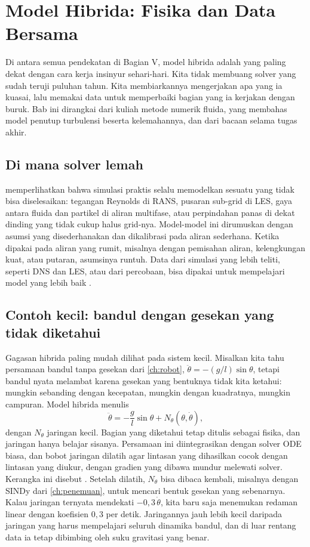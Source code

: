\chapter{Model Hibrida: Fisika dan Data Bersama}
\label{ch:hibrida}

Di antara semua pendekatan di Bagian V, model hibrida adalah yang paling dekat dengan cara kerja
insinyur sehari-hari. Kita tidak membuang solver yang sudah teruji puluhan tahun. Kita membiarkannya
mengerjakan apa yang ia kuasai, lalu memakai data untuk memperbaiki bagian yang ia kerjakan dengan
buruk. Bab ini dirangkai dari kuliah metode numerik fluida, yang membahas model penutup turbulensi
beserta kelemahannya, dan dari bacaan selama tugas akhir.

\section{Di mana solver lemah}

 memperlihatkan bahwa simulasi praktis selalu memodelkan sesuatu yang tidak bisa
diselesaikan: tegangan Reynolds di RANS, pusaran sub-grid di LES, gaya antara fluida dan partikel di
aliran multifase, atau perpindahan panas di dekat dinding yang tidak cukup halus grid-nya. Model-model ini
dirumuskan dengan asumsi yang disederhanakan dan dikalibrasi pada aliran sederhana. Ketika dipakai pada
aliran yang rumit, misalnya dengan pemisahan aliran, kelengkungan kuat, atau putaran, asumsinya runtuh.
Data dari simulasi yang lebih teliti, seperti DNS dan LES, atau dari percobaan, bisa dipakai untuk
mempelajari model yang lebih baik \citep{duraisamy2019}.

\section{Contoh kecil: bandul dengan gesekan yang tidak diketahui}

Gagasan hibrida paling mudah dilihat pada sistem kecil. Misalkan kita tahu persamaan bandul tanpa gesekan dari
\cref{ch:robot}, $\ddot\theta=-(g/l)\sin\theta$, tetapi bandul nyata melambat karena gesekan yang bentuknya tidak kita
ketahui: mungkin sebanding dengan kecepatan, mungkin dengan kuadratnya, mungkin campuran. Model hibrida menulis
\begin{equation}
\ddot\theta=-\frac gl\sin\theta+N_\theta(\theta,\dot\theta),
\end{equation}
dengan $N_\theta$ jaringan kecil. Bagian yang diketahui tetap ditulis sebagai fisika, dan jaringan hanya belajar sisanya.
Persamaan ini diintegrasikan dengan solver ODE biasa, dan bobot jaringan dilatih agar lintasan yang dihasilkan cocok
dengan lintasan yang diukur, dengan gradien yang dibawa mundur melewati solver. Kerangka ini disebut
 \citep{rackauckas2020}. Setelah dilatih, $N_\theta$ bisa dibaca kembali,
misalnya dengan SINDy dari \cref{ch:penemuan}, untuk mencari bentuk gesekan yang sebenarnya. Kalau jaringan ternyata
mendekati $-0{,}3\,\dot\theta$, kita baru saja menemukan redaman linear dengan koefisien $0{,}3$ per detik. Jaringannya
jauh lebih kecil daripada jaringan yang harus mempelajari seluruh dinamika bandul, dan di luar rentang data ia tetap
dibimbing oleh suku gravitasi yang benar.

